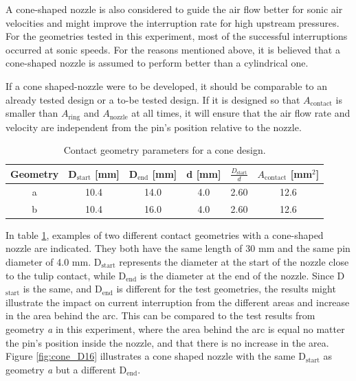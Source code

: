 \documentclass[10pt,a4paper,twoside]{article}
\begin{document}
A cone-shaped nozzle is also considered to guide the air flow better for sonic air velocities and might improve the interruption rate for high upstream pressures. For the geometries tested in this experiment, most of the successful interruptions occurred at sonic speeds. For the reasons mentioned above, it is believed that a cone-shaped nozzle is assumed to perform better than a cylindrical one.

If a cone shaped-nozzle were to be developed, it should be comparable to an already tested design or a to-be tested design. If it is designed so that $A_\mathrm{{contact}}$ is smaller than $A_\mathrm{{ring}}$ and $A_\mathrm{{nozzle}}$ at all times, it will ensure that the air flow rate and velocity are independent from the pin's position relative to the nozzle.

\begin{table}[H]
\center
\caption{Contact geometry parameters for a cone design.}
 \begin{tabular}{|c|c|c|c|c|c|}
\hline 
Geometry & D$_\mathrm{{start}}$ [mm]& D$_\mathrm{{end}}$ [mm] & d [mm] & $\frac{D_\mathrm{{start}}}{d}$ & $A_\mathrm{{contact}}$ [mm$^2$] \\ 
\hline 
a & 10.4 & 14.0 & 4.0 & 2.60 & 12.6  \\ 
\hline 
b & 10.4 & 16.0 & 4.0 & 2.60 & 12.6  \\ 
\hline 
\end{tabular} 
\label{tab:contGeoParaCone}
\end{table}

In table \ref{tab:contGeoParaCone}, examples of two different contact geometries with a cone-shaped nozzle are indicated. They both have the same length of 30 mm and the same pin diameter of 4.0 mm. D$_\mathrm{{start}}$ represents the diameter at the start of the nozzle close to the tulip contact, while D$_\mathrm{{end}}$ is the diameter at the end of the nozzle. Since D$_\mathrm{{start}}$ is the same, and D$_\mathrm{{end}}$ is different for the test geometries, the results might illustrate the impact on current interruption from the different areas and increase in the area behind the arc. This can be compared to the test results from geometry \textit{a} in this experiment, where the area behind the arc is equal no matter the pin's position inside the nozzle, and that there is no increase in the area. Figure \ref{fig:cone_D16} illustrates a cone shaped nozzle with the same D$_\mathrm{{start}}$ as geometry \textit{a} but a different D$_\mathrm{{end}}$. 
\end{document}
